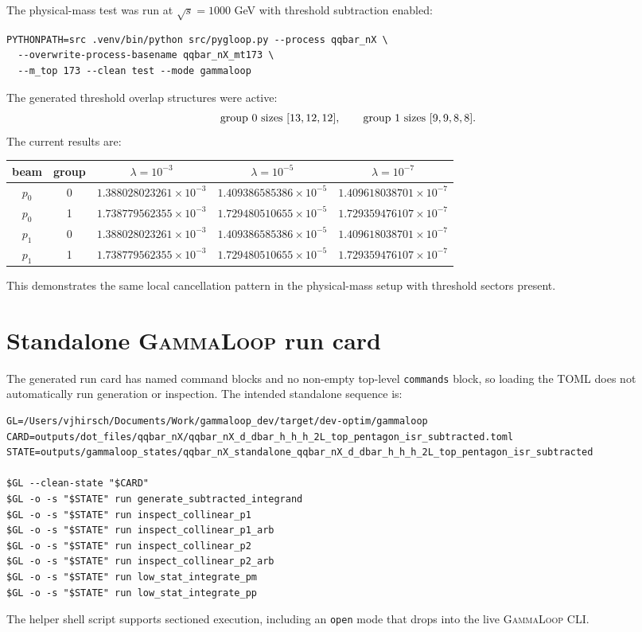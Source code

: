 \documentclass[11pt]{article}
\newcommand{\GammaLoop}{\textsc{GammaLoop}}
\begin{document}
The physical-mass test was run at \(\sqrt{s}=1000\) GeV with threshold
subtraction enabled:
\begin{lstlisting}
PYTHONPATH=src .venv/bin/python src/pygloop.py --process qqbar_nX \
  --overwrite-process-basename qqbar_nX_mt173 \
  --m_top 173 --clean test --mode gammaloop
\end{lstlisting}
The generated threshold overlap structures were active:
\[
  \hbox{group 0 sizes }[13,12,12],
  \qquad
  \hbox{group 1 sizes }[9,9,8,8].
\]
The current results are:
\begin{center}
\begin{tabular}{ccccc}
\toprule
beam & group & \(\lambda=10^{-3}\) & \(\lambda=10^{-5}\) & \(\lambda=10^{-7}\)\\
\midrule
\(p_0\) & 0 & \(1.388028023261\times10^{-3}\) & \(1.409386585386\times10^{-5}\) & \(1.409618038701\times10^{-7}\)\\
\(p_0\) & 1 & \(1.738779562355\times10^{-3}\) & \(1.729480510655\times10^{-5}\) & \(1.729359476107\times10^{-7}\)\\
\(p_1\) & 0 & \(1.388028023261\times10^{-3}\) & \(1.409386585386\times10^{-5}\) & \(1.409618038701\times10^{-7}\)\\
\(p_1\) & 1 & \(1.738779562355\times10^{-3}\) & \(1.729480510655\times10^{-5}\) & \(1.729359476107\times10^{-7}\)\\
\bottomrule
\end{tabular}
\end{center}
This demonstrates the same local cancellation pattern in the physical-mass
setup with threshold sectors present.

\section{Standalone \GammaLoop{} run card}

The generated run card has named command blocks and no non-empty top-level
\texttt{commands} block, so loading the TOML does not automatically run
generation or inspection.  The intended standalone sequence is:
\begin{lstlisting}
GL=/Users/vjhirsch/Documents/Work/gammaloop_dev/target/dev-optim/gammaloop
CARD=outputs/dot_files/qqbar_nX/qqbar_nX_d_dbar_h_h_h_2L_top_pentagon_isr_subtracted.toml
STATE=outputs/gammaloop_states/qqbar_nX_standalone_qqbar_nX_d_dbar_h_h_h_2L_top_pentagon_isr_subtracted

$GL --clean-state "$CARD"
$GL -o -s "$STATE" run generate_subtracted_integrand
$GL -o -s "$STATE" run inspect_collinear_p1
$GL -o -s "$STATE" run inspect_collinear_p1_arb
$GL -o -s "$STATE" run inspect_collinear_p2
$GL -o -s "$STATE" run inspect_collinear_p2_arb
$GL -o -s "$STATE" run low_stat_integrate_pm
$GL -o -s "$STATE" run low_stat_integrate_pp
\end{lstlisting}
The helper shell script supports sectioned execution, including an \texttt{open}
mode that drops into the live \GammaLoop{} CLI.
\end{document}
